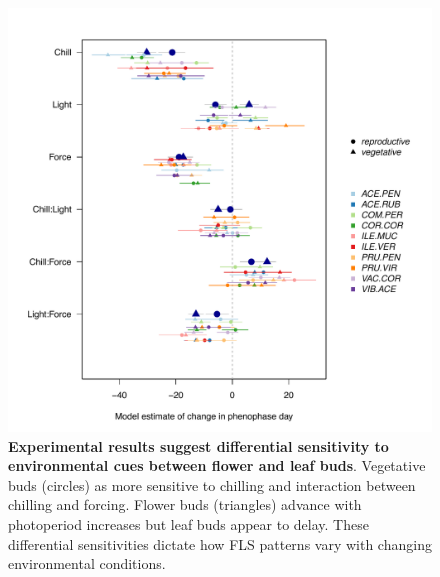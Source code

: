 \documentclass[11pt]{article}
\begin{document}
\begin{figure}[h!]
    \centering
         \includegraphics[width=\textwidth]{..//Plots/Flobuds_manuscript_figs/budburstvsflowering.pdf}
    \caption{\textbf{Experimental results suggest differential sensitivity to environmental cues between flower and leaf buds}. Vegetative buds (circles) as more sensitive to chilling and interaction between chilling and forcing. Flower buds (triangles) advance with photoperiod increases but leaf buds appear to delay. These differential sensitivities dictate how FLS patterns vary with changing environmental conditions.}
    \label{fig:model}
\end{figure}
\end{document}
